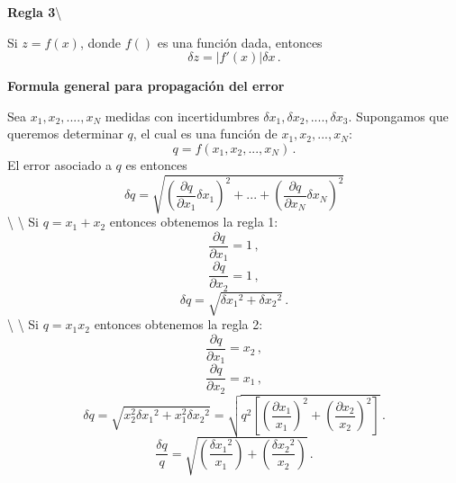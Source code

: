 \documentclass[
]{agujournal2019}
\begin{document}
\vspace{0.5cm}

\noindent \textbf {Regla 3}\textbackslash{}

\noindent Si \(z=f(x)\), donde \(f()\) es una función dada, entonces
\[\delta{z}=|f'(x)|\delta{x}\,.\]

\vspace{0.5cm}

\noindent \textbf {Formula general para propagación del error}

\noindent Sea \(x_1, x_2,....,x_N\) medidas con incertidumbres
\(\delta{x_1},\delta{x_2},....,\delta{x_3}\). Supongamos que queremos
determinar \(q\), el cual es una función de \(x_1,x_2,...,x_N\):
\[q=f(x_1, x_2,...,x_N)\,.\] El error asociado a \(q\) es entonces
\[\delta{q}=\sqrt{\left( \frac{\partial{q}}{\partial{x_1}}\delta{x_1}\right)^2 + ... +
                  \left( \frac{\partial{q}}{\partial{x_N}}\delta{x_N}\right)^2}\]
\textbackslash{} \textbackslash{} \noindent Si \(q=x_1+x_2\) entonces
obtenemos la regla 1: \[\frac{\partial{q}}{\partial{x_1}}=1\,,\]
\[\frac{\partial{q}}{\partial{x_2}}=1\,,\]
\[\delta{q}=\sqrt{\delta{x_1}^2 + \delta{x_2}^2}\,.\] \textbackslash{}
\textbackslash{} \noindent Si \(q=x_1x_2\) entonces obtenemos la regla
2: \[\frac{\partial{q}}{\partial{x_1}}=x_2\,,\]
\[\frac{\partial{q}}{\partial{x_2}}=x_1\,,\]
\[\delta{q}=\sqrt{x^2_2\delta{x_1}^2 + x^2_1\delta{x_2}^2}=\sqrt{q^2\left[ \left(\frac{\partial{x_1}}{x_1}\right)^2 + \left(\frac{\partial{x_2}}{x_2}\right)^2\right]}\,.\]
\[\frac{\delta{q}}{q}=\sqrt{\left(\frac{\delta{x_1}^2}{x_1}\right) + \left(\frac{\delta{x_2}^2}{x_2}\right)}\,.\]

\vspace{0.5cm}
\end{document}
